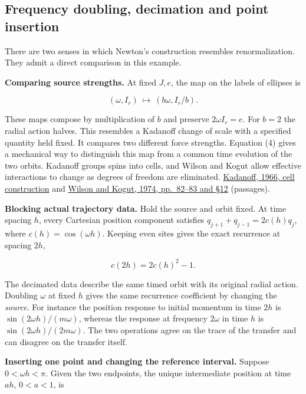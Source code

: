 \documentclass[11pt,a4paper]{article}
\begin{document}
\subsection{Frequency doubling, decimation and point
insertion}\label{frequency-doubling-decimation-and-point-insertion}

There are two senses in which Newton's construction resembles
renormalization. They admit a direct comparison in this example.

\textbf{Comparing source strengths.} At fixed \(J,e\), the map on the
labels of ellipses is

\[
             (\omega,I_r)\ \longmapsto\ (b\omega,I_r/b).
\]

These maps compose by multiplication of \(b\) and preserve
\(2\omega I_r=e\). For \(b=2\) the radial action halves. This resembles
a Kadanoff change of scale with a specified quantity held fixed. It
compares two different force strengths. Equation (4) gives a mechanical
way to distinguish this map from a common time evolution of the two
orbits. Kadanoff groups spins into cells, and Wilson and Kogut allow
effective interactions to change as degrees of freedom are eliminated.
\href{https://inspirehep.net/files/1b6824b02d6ea885938ba7992c217b69}{Kadanoff,
1966, cell construction} and
\href{https://theory.tifr.res.in/~tridib/ReferenceMaterial/WilsonKogut.pdf}{Wilson
and Kogut, 1974, pp.~82--83 and §12} (passages).

\textbf{Blocking actual trajectory data.} Hold the source and orbit
fixed. At time spacing \(h\), every Cartesian position component
satisfies \(q_{j+1}+q_{j-1}=2c(h)q_j\), where \(c(h)=\cos(\omega h)\).
Keeping even sites gives the exact recurrence at spacing \(2h\),

\[
                   c(2h)=2c(h)^2-1.                                \tag{7}
\]

The decimated data describe the same timed orbit with its original
radial action. Doubling \(\omega\) at fixed \(h\) gives the same
recurrence coefficient by changing the \emph{source}. For instance the
position response to initial momentum in time \(2h\) is
\(\sin(2\omega h)/(m\omega)\), whereas the response at frequency
\(2\omega\) in time \(h\) is \(\sin(2\omega h)/(2m\omega)\). The two
operations agree on the trace of the transfer and can disagree on the
transfer itself.

\textbf{Inserting one point and changing the reference interval.}
Suppose \(0<\omega h<\pi\). Given the two endpoints, the unique
intermediate position at time \(a h\), \(0<a<1\), is
\end{document}
